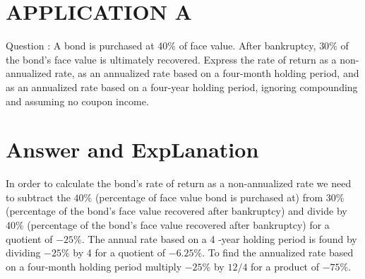 \documentclass[11pt]{article}
\begin{document}
\section*{APPLICATION A}
Question : A bond is purchased at $40 \%$ of face value. After bankruptcy, $30 \%$ of the bond's face value is ultimately recovered. Express the rate of return as a non-annualized rate, as an annualized rate based on a four-month holding period, and as an annualized rate based on a four-year holding period, ignoring compounding and assuming no coupon income.

\section*{Answer and ExpLanation}
In order to calculate the bond's rate of return as a non-annualized rate we need to subtract the $40 \%$ (percentage of face value bond is purchased at) from $30 \%$ (percentage of the bond's face value recovered after bankruptcy) and divide by $40 \%$ (percentage of the bond's face value recovered after bankruptcy) for a quotient of $-25 \%$. The annual rate based on a 4 -year holding period is found by dividing $-25 \%$ by 4 for a quotient of $-6.25 \%$. To find the annualized rate based on a four-month holding period multiply $-25 \%$ by $12 / 4$ for a product of $-75 \%$.
\end{document}
